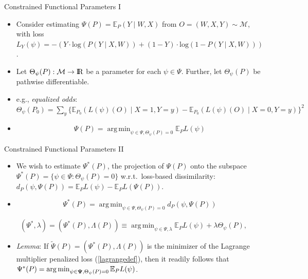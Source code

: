 \documentclass[12pt,t]{beamer}
\newcommand{\E}{\mathbb{E}}
\DeclareMathOperator*{\argmin}{arg\,min}
\newcommand{\openr}{\hbox{${\rm I\kern-.2em R}$}}
\begin{document}

\begin{frame}[c]{Constrained Functional Parameters I}

\begin{center}
\begin{itemize}
  \itemsep12pt
  \item Consider estimating $\Psi(P) = \E_P(Y \mid W, X)$ from $O = (W, X, Y)
    \sim \mathcal{M}$, with loss $L_Y(\psi) = -(Y \cdot \text{log}(P(Y \mid X,
    W)) + (1 - Y) \cdot \text{log}(1 - P(Y \mid X, W)))$.
  \item Let $\Theta_{\psi}(P): \mathcal{M} \rightarrow \openr$ be a parameter
    for each $\psi \in \Psi$. Further, let $\Theta_{\psi}(P)$ be pathwise
    differentiable.
  \item e.g., \textit{equalized odds}: $\Theta_{\psi}(P_0) = \sum_y
    \{\E_{P_0}(L(\psi)(O) \mid X = 1, Y = y) - \E_{P_0}(L(\psi)(O) \mid X = 0,
    Y = y)\}^2$
  \item $$ \Psi(P) = \argmin_{\psi \in \Psi, \Theta_{\psi}(P) = 0} \E_PL(\psi)$$
\end{itemize}
\end{center}

\note{
}

\end{frame}


\begin{frame}[c]{Constrained Functional Parameters II}

\begin{center}
\begin{itemize}
  \itemsep12pt
  \item We wish to estimate $\Psi^*(P)$, the projection of $\Psi(P)$ onto the
    subspace $\Psi^*(P) = \{\psi \in \Psi: \Theta_{\psi}(P) = 0\}$
    w.r.t.~loss-based dissimilarity: $d_{P}(\psi, \Psi(P)) = \E_PL(\psi) -
    \E_PL(\Psi(P))$.
  \item $$ \Psi^*(P) = \argmin_{\psi \in \Psi, \Theta_{\psi}(P) = 0} d_{P}(\psi,
    \Psi(P))$$
\end{itemize}

\begin{equation}\label{lagrangedef}
  (\Psi^*, \lambda) = (\Psi^*(P), \Lambda(P)) \equiv \argmin_{\psi \in \Psi,
    \lambda} \E_PL(\psi) + \lambda \Theta_{\psi}(P),
\end{equation}

\begin{itemize}
  \item \textit{Lemma}: If $\widetilde{\Psi}(P) = (\Psi^*(P), \Lambda(P))$ is
    the minimizer of the Lagrange multiplier penalized loss (\ref{lagrangedef}),
    then it readily follows that $\Psi^*(P) = \argmin_{\psi \in {\bf \Psi},
      \Theta_{\psi}(P) = 0} \E_{P}L(\psi)$.
\end{itemize}

\end{center}

\note{
}

\end{frame}
\end{document}
